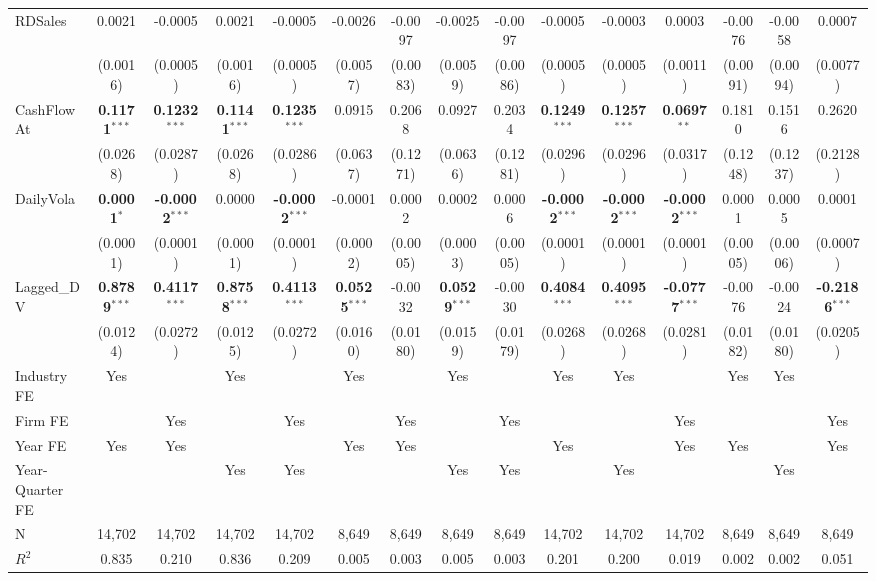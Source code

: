 \documentclass[11pt,a4paper]{article}
\begin{document}
\begin{table}[htbp]
\begin{tabular}{lcccccccccccccc}
RDSales & 0.0021 & -0.0005 & 0.0021 & -0.0005 & -0.0026 & -0.0097 & -0.0025 & -0.0097 & -0.0005 & -0.0003 & 0.0003 & -0.0076 & -0.0058 & 0.0007 \\
 & (0.0016) & (0.0005) & (0.0016) & (0.0005) & (0.0057) & (0.0083) & (0.0059) & (0.0086) & (0.0005) & (0.0005) & (0.0011) & (0.0091) & (0.0094) & (0.0077) \\
CashFlowAt & \textbf{0.1171}$^{***}$ & \textbf{0.1232}$^{***}$ & \textbf{0.1141}$^{***}$ & \textbf{0.1235}$^{***}$ & 0.0915 & 0.2068 & 0.0927 & 0.2034 & \textbf{0.1249}$^{***}$ & \textbf{0.1257}$^{***}$ & \textbf{0.0697}$^{**}$ & 0.1810 & 0.1516 & 0.2620 \\
 & (0.0268) & (0.0287) & (0.0268) & (0.0286) & (0.0637) & (0.1271) & (0.0636) & (0.1281) & (0.0296) & (0.0296) & (0.0317) & (0.1248) & (0.1237) & (0.2128) \\
DailyVola & \textbf{0.0001}$^{*}$ & \textbf{-0.0002}$^{***}$ & 0.0000 & \textbf{-0.0002}$^{***}$ & -0.0001 & 0.0002 & 0.0002 & 0.0006 & \textbf{-0.0002}$^{***}$ & \textbf{-0.0002}$^{***}$ & \textbf{-0.0002}$^{***}$ & 0.0001 & 0.0005 & 0.0001 \\
 & (0.0001) & (0.0001) & (0.0001) & (0.0001) & (0.0002) & (0.0005) & (0.0003) & (0.0005) & (0.0001) & (0.0001) & (0.0001) & (0.0005) & (0.0006) & (0.0007) \\
Lagged\_DV & \textbf{0.8789}$^{***}$ & \textbf{0.4117}$^{***}$ & \textbf{0.8758}$^{***}$ & \textbf{0.4113}$^{***}$ & \textbf{0.0525}$^{***}$ & -0.0032 & \textbf{0.0529}$^{***}$ & -0.0030 & \textbf{0.4084}$^{***}$ & \textbf{0.4095}$^{***}$ & \textbf{-0.0777}$^{***}$ & -0.0076 & -0.0024 & \textbf{-0.2186}$^{***}$ \\
 & (0.0124) & (0.0272) & (0.0125) & (0.0272) & (0.0160) & (0.0180) & (0.0159) & (0.0179) & (0.0268) & (0.0268) & (0.0281) & (0.0182) & (0.0180) & (0.0205) \\
\midrule
Industry FE & Yes &  & Yes &  & Yes &  & Yes &  & Yes & Yes &  & Yes & Yes &  \\
Firm FE &  & Yes &  & Yes &  & Yes &  & Yes &  &  & Yes &  &  & Yes \\
Year FE & Yes & Yes &  &  & Yes & Yes &  &  & Yes &  & Yes & Yes &  & Yes \\
Year-Quarter FE &  &  & Yes & Yes &  &  & Yes & Yes &  & Yes &  &  & Yes &  \\
\midrule
N & 14,702 & 14,702 & 14,702 & 14,702 & 8,649 & 8,649 & 8,649 & 8,649 & 14,702 & 14,702 & 14,702 & 8,649 & 8,649 & 8,649 \\
$R^2$ & 0.835 & 0.210 & 0.836 & 0.209 & 0.005 & 0.003 & 0.005 & 0.003 & 0.201 & 0.200 & 0.019 & 0.002 & 0.002 & 0.051 \\

\end{tabular}
\end{table}
\end{document}
